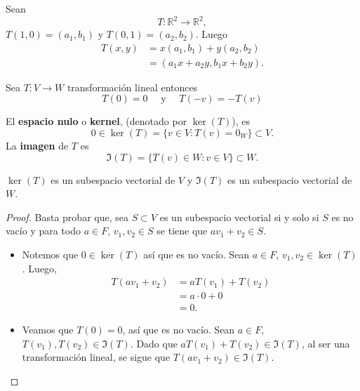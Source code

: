 \documentclass[12pt,a4paper]{book}
\begin{document}
    \begin{ejemplo}
    \label{ej:23}
        Sean
        \begin{equation*}
            T: \mathbb{R}^{2} \to \mathbb{R}^{2},
        \end{equation*}
        $T(1,0) = (a_{1}, b_{1})$ y $T(0, 1) = (a_{2}, b_{2})$. Luego
        \begin{align*}
            T(x, y) & = x(a_{1}, b_{1}) + y(a_{2}, b_{2})\\
            & = (a_{1}x + a_{2}y, b_{1}x + b_{2}y).
        \end{align*}
    \end{ejemplo}

    Sea $T:V\to W$ transformación lineal entonces
    \begin{equation*}
        T(0)=0\quad\text{ y }\quad T(-v)=-T(v)
    \end{equation*}

    \begin{definicion}
    \label{def:21}
        El \textbf{espacio nulo} o \textbf{kernel}, (denotado por $\ker(T)$), es
        \begin{equation*}
            0\in\ker(T)=\{v\in V:T(v)=0_{W}\}\subset V.
        \end{equation*}
        La \textbf{imagen} de $T$ es
        \begin{equation*}
            \Im(T)=\{T(v)\in W:v\in V\}\subset W.
        \end{equation*}
    \end{definicion}

    \begin{proposicion}
    \label{prop:26}
        $\ker(T)$ es un subespacio vectorial de $V$ y $\Im(T)$ es un subespacio vectorial de $W$.
    \end{proposicion}

    \begin{proof}
        Basta probar que, sea $S \subset V$ es un subespacio vectorial si y solo si $S$ es no vacío y para todo $a \in F$, $v_{1}, v_{2} \in S$ se tiene que $av_{1} + v_{2} \in S$.
        \begin{itemize}
            \item[(1)] Notemos que $0 \in \ker(T)$ así que es no vacío. Sean $a \in F$, $v_{1}, v_{2} \in \ker(T)$. Luego,
            \begin{align*}
                T(av_{1} + v_{2}) & = aT(v_{1}) + T(v_{2})\\
                & = a \cdot 0 + 0\\
                & = 0.
            \end{align*}
            \item[(2)] Veamos que $T(0) = 0$, así que es no vacío. Sean $a \in F$, $T(v_{1}), T(v_{2}) \in \Im(T)$. Dado que $aT(v_{1}) + T(v_{2}) \in \Im(T)$, al ser una transformación lineal, se sigue que $T(av_{1} + v_{2}) \in \Im(T)$.
        \end{itemize}
    \end{proof}
\end{document}
